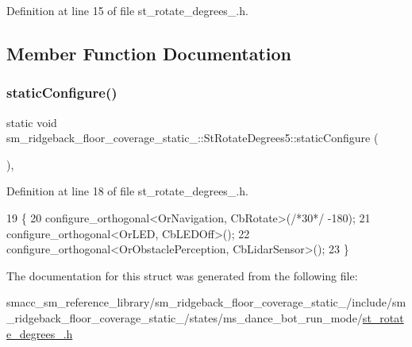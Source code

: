 Definition at line 15 of file st\+\_\+rotate\+\_\+degrees\+\_.\+h.



\subsection{Member Function Documentation}
\mbox{\label{structsm__ridgeback__floor__coverage__static__1_1_1StRotateDegrees5_ae37fffe9d89ddc649f626cb6bdf034ee}} 
\subsubsection{\texorpdfstring{static\+Configure()}{staticConfigure()}}
{\footnotesize\ttfamily static void sm\+\_\+ridgeback\+\_\+floor\+\_\+coverage\+\_\+static\+\_\+::\+St\+Rotate\+Degrees5\+::static\+Configure (\begin{DoxyParamCaption}{ }\end{DoxyParamCaption})\hspace{0.3cm}{\ttfamily [inline]}, {\ttfamily [static]}}



Definition at line 18 of file st\+\_\+rotate\+\_\+degrees\+\_.\+h.


\begin{DoxyCode}
19   \{
20     configure\_orthogonal<OrNavigation, CbRotate>(\textcolor{comment}{/*30*/} -180);
21     configure\_orthogonal<OrLED, CbLEDOff>();
22     configure\_orthogonal<OrObstaclePerception, CbLidarSensor>();
23   \}
\end{DoxyCode}


The documentation for this struct was generated from the following file\+:\begin{DoxyCompactItemize}
\item 
smacc\+\_\+sm\+\_\+reference\+\_\+library/sm\+\_\+ridgeback\+\_\+floor\+\_\+coverage\+\_\+static\+\_/include/sm\+\_\+ridgeback\+\_\+floor\+\_\+coverage\+\_\+static\+\_/states/ms\+\_\+dance\+\_\+bot\+\_\+run\+\_\+mode/\hyperlink{sm__ridgeback__floor__coverage__static__1_2include_2sm__ridgeback__floor__coverage__static__1_2s9a8cffb2bf8b64abaf25ecff1d61b725}{st\+\_\+rotate\+\_\+degrees\+\_.\+h}\end{DoxyCompactItemize}
